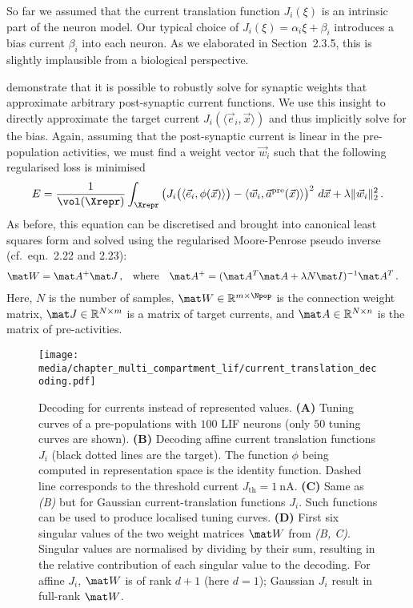 So far we assumed that the current translation function $J_i(\xi)$ is an intrinsic part of the neuron model.
Our typical choice of $J_i(\xi) = \alpha_i \xi + \beta_i$ introduces a bias current $\beta_i$ into each neuron.
As we elaborated in Section~2.3.5, this is slightly implausible from a biological perspective.

 demonstrate that it is possible to robustly solve for synaptic weights that approximate arbitrary post-synaptic current functions.
We use this insight to directly approximate the target current $J_i(\langle \vec e_i, \vec x \rangle)$ and thus implicitly solve for the bias.
Again, assuming that the post-synaptic current is linear in the pre-population activities, we must find a weight vector $\vec w_i$ such that the following regularised loss is minimised
\begin{align}
E = \frac{1}{\vol(\Xrepr)} \int_{\Xrepr} \left( J_i\bigl(\langle \vec e_i, \phi(\vec x)\rangle\bigr) - \langle \vec w_i, \vec a^\mathrm{pre}(\vec x) \rangle \right)^2 \, d\vec x + \lambda \| \vec w_i \|_\mathrm{2}^2\,.
\label{eqn:decode_current}
\end{align}
As before, this equation can be discretised and brought into canonical least squares form and solved using the regularised Moore-Penrose pseudo inverse (cf.~eqn.~2.22 and 2.23):
\begin{align*}
	\mat W &= \mat A^+ \mat J \,, & \text{where} \quad \mat A^+ &= (\mat A^T \mat A + \lambda N \mat I)^{-1} \mat A^T \,.
\end{align*}
Here, $N$ is the number of samples, $\mat W \in \mathbb{R}^{m \times \Npop}$ is the connection weight matrix, $\mat J \in \mathbb{R}^{N \times m}$ is a matrix of target currents, and $\mat A \in \mathbb{R}^{N \times n}$ is the matrix of pre-activities.

\begin{figure}
	\texttt{[image: media/chapter\_multi\_compartment\_lif/current\_translation\_decoding.pdf]}%
	{\label{fig:current_translation_decoding_a}}%
	{\label{fig:current_translation_decoding_b}}%
	{\label{fig:current_translation_decoding_c}}%
	{\label{fig:current_translation_decoding_d}}%
	\caption[Decoding for currents instead of represented values]{Decoding for currents instead of represented values. \textbf{(A)} Tuning curves of a pre-populations with $100$ LIF neurons (only $50$ tuning curves are shown). \textbf{(B)} Decoding affine current translation functions $J_i$ (black dotted lines are the target). The function $\phi$ being computed in re\-pre\-sen\-tat\-ion space is the identity function. Dashed line corresponds to the threshold current $J_\mathrm{th} = \SI{1}{\nano\ampere}$.
	\textbf{(C)} Same as \emph{(B)} but for Gaussian current-translation functions $J_i$. Such functions can be used to produce localised tuning curves.
	\textbf{(D)} First six singular values of the two weight matrices $\mat W$ from \emph{(B, C)}.
	Singular values are normalised by dividing by their sum, resulting in the relative contribution of each singular value to the decoding.
	For affine $J_i$, $\mat W$ is of rank $d + 1$ (here $d = 1$);
	Gaussian $J_i$ result in full-rank $\mat W$.
	}
\end{figure}

